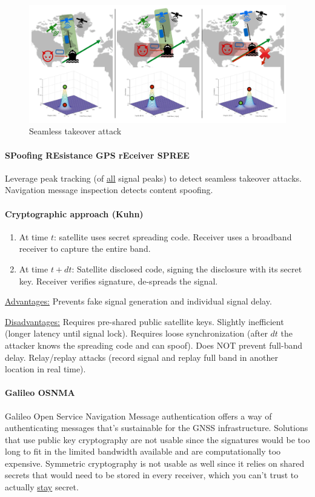 \begin{figure}[h]
	\centering
	\includegraphics[scale=0.4]{images/4-seamless-takeover.png}
	\caption{Seamless takeover attack}%
	\label{fig:seamless-takeover}
\end{figure}

\paragraph{SPoofing REsistance GPS rEceiver SPREE}
Leverage peak tracking (of \underline{all} signal peaks) to detect seamless takeover attacks.
Navigation message inspection detects content spoofing.

\paragraph{Cryptographic approach (Kuhn)}
\begin{enumerate}
	\item At time $t$: satellite uses secret spreading code.
	Receiver uses a broadband receiver to capture the entire band.
	\item At time $t+dt$: Satellite disclosed code, signing the disclosure with its secret key.
	Receiver verifies signature, de-spreads the signal.
\end{enumerate}

\underline{Advantages:}
Prevents fake signal generation and individual signal delay.

\underline{Disadvantages:}
Requires pre-shared public satellite keys.
Slightly inefficient (longer latency until signal lock).
Requires loose synchronization (after $dt$ the attacker knows the spreading code and can spoof).
Does NOT prevent full-band delay.
Relay/replay attacks (record signal and replay full band in another location in real time).

\paragraph{Galileo OSNMA}
Galileo Open Service Navigation Message authentication offers a way of authenticating messages that's sustainable for the GNSS infrastructure. Solutions that use public key cryptography are not usable since the signatures would be too long to fit in the limited bandwidth available and are computationally too expensive. Symmetric cryptography is not usable as well since it relies on shared secrets that would need to be stored in every receiver, which you can't trust to actually \underline{stay} secret.

